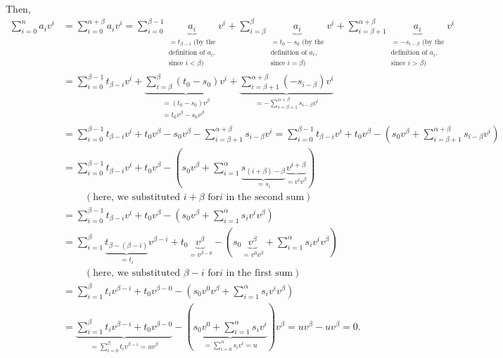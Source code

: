 \documentclass[12pt,final,notitlepage,onecolumn]{article}%
\begin{document}
Then,%
\begin{align*}
\sum\limits_{i=0}^{n}a_{i}v^{i}  &  =\sum\limits_{i=0}^{\alpha+\beta}%
a_{i}v^{i}=\sum\limits_{i=0}^{\beta-1}\underbrace{a_{i}}_{\substack{=t_{\beta
-i}\text{ (by the}\\\text{definition of }a_{i}\text{,}\\\text{since }%
i<\beta\text{)}}}v^{i}+\sum\limits_{i=\beta}^{\beta}\underbrace{a_{i}%
}_{\substack{=t_{0}-s_{0}\text{ (by the}\\\text{definition of }a_{i}%
\text{,}\\\text{since }i=\beta\text{)}}}v^{i}+\sum\limits_{i=\beta+1}%
^{\alpha+\beta}\underbrace{a_{i}}_{\substack{=-s_{i-\beta}\text{ (by
the}\\\text{definition of }a_{i}\text{,}\\\text{since }i>\beta\text{)}}%
}v^{i}\\
&  =\sum\limits_{i=0}^{\beta-1}t_{\beta-i}v^{i}+\underbrace{\sum
\limits_{i=\beta}^{\beta}\left(  t_{0}-s_{0}\right)  v^{i}}%
_{\substack{=\left(  t_{0}-s_{0}\right)  v^{\beta}\\=t_{0}v^{\beta}%
-s_{0}v^{\beta}}}+\underbrace{\sum\limits_{i=\beta+1}^{\alpha+\beta}\left(
-s_{i-\beta}\right)  v^{i}}_{=-\sum\limits_{i=\beta+1}^{\alpha+\beta
}s_{i-\beta}v^{i}}\\
&  =\sum\limits_{i=0}^{\beta-1}t_{\beta-i}v^{i}+t_{0}v^{\beta}-s_{0}v^{\beta
}-\sum\limits_{i=\beta+1}^{\alpha+\beta}s_{i-\beta}v^{i}=\sum\limits_{i=0}%
^{\beta-1}t_{\beta-i}v^{i}+t_{0}v^{\beta}-\left(  s_{0}v^{\beta}%
+\sum\limits_{i=\beta+1}^{\alpha+\beta}s_{i-\beta}v^{i}\right) \\
&  =\sum\limits_{i=0}^{\beta-1}t_{\beta-i}v^{i}+t_{0}v^{\beta}-\left(
s_{0}v^{\beta}+\sum\limits_{i=1}^{\alpha}\underbrace{s_{\left(  i+\beta
\right)  -\beta}}_{=s_{i}}\underbrace{v^{i+\beta}}_{=v^{i}v^{\beta}}\right) \\
&  \ \ \ \ \ \ \ \ \ \ \left(  \text{here, we substituted }i+\beta\text{ for
}i\text{ in the second sum}\right) \\
&  =\sum\limits_{i=0}^{\beta-1}t_{\beta-i}v^{i}+t_{0}v^{\beta}-\left(
s_{0}v^{\beta}+\sum\limits_{i=1}^{\alpha}s_{i}v^{i}v^{\beta}\right) \\
&  =\sum\limits_{i=1}^{\beta}\underbrace{t_{\beta-\left(  \beta-i\right)  }%
}_{=t_{i}}v^{\beta-i}+t_{0}\underbrace{v^{\beta}}_{=v^{\beta-0}}-\left(
s_{0}\underbrace{v^{\beta}}_{=v^{0}v^{\beta}}+\sum\limits_{i=1}^{\alpha}%
s_{i}v^{i}v^{\beta}\right) \\
&  \ \ \ \ \ \ \ \ \ \ \left(  \text{here, we substituted }\beta-i\text{ for
}i\text{ in the first sum}\right) \\
&  =\sum\limits_{i=1}^{\beta}t_{i}v^{\beta-i}+t_{0}v^{\beta-0}-\left(
s_{0}v^{0}v^{\beta}+\sum\limits_{i=1}^{\alpha}s_{i}v^{i}v^{\beta}\right) \\
&  =\underbrace{\sum\limits_{i=1}^{\beta}t_{i}v^{\beta-i}+t_{0}v^{\beta-0}%
}_{=\sum\limits_{i=0}^{\beta}t_{i}v^{\beta-i}=uv^{\beta}}-\left(
\underbrace{s_{0}v^{0}+\sum\limits_{i=1}^{\alpha}s_{i}v^{i}}_{=\sum
\limits_{i=0}^{\alpha}s_{i}v^{i}=u}\right)  v^{\beta}=uv^{\beta}-uv^{\beta}=0.
\end{align*}
\end{document}
